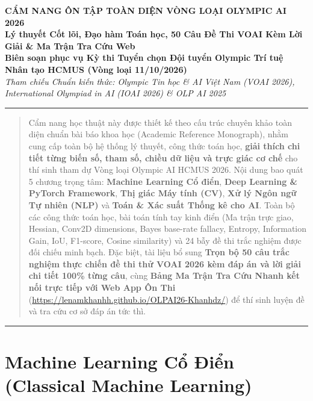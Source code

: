 \documentclass[10pt,a4paper]{article}
\begin{document}
\begin{center}
    {\Huge \textbf{\color{primaryblue} CẨM NANG ÔN TẬP TOÀN DIỆN VÒNG LOẠI OLYMPIC AI 2026}} \\[0.5em]
    {\LARGE \textbf{\color{secondaryblue} Lý thuyết Cốt lõi, Đạo hàm Toán học, 50 Câu Đề Thi VOAI Kèm Lời Giải \& Ma Trận Tra Cứu Web}} \\[0.8em]
    {\normalsize \textbf{Biên soạn phục vụ Kỳ thi Tuyển chọn Đội tuyển Olympic Trí tuệ Nhân tạo HCMUS (Vòng loại 11/10/2026)}} \\[0.4em]
    {\small \textit{Tham chiếu Chuẩn kiến thức: Olympic Tin học \& AI Việt Nam (VOAI 2026), International Olympiad in AI (IOAI 2026) \& OLP AI 2025}}
\end{center}

\vspace{0.5em}
\hrule height 1.2pt
\vspace{0.8em}

\begin{abstract}
\noindent Cẩm nang học thuật này được thiết kế theo cấu trúc chuyên khảo toàn diện chuẩn bài báo khoa học (Academic Reference Monograph), nhằm cung cấp toàn bộ hệ thống lý thuyết, công thức toán học, \textbf{giải thích chi tiết từng biến số, tham số, chiều dữ liệu và trực giác cơ chế} cho thí sinh tham dự Vòng loại Olympic AI HCMUS 2026. Nội dung bao quát 5 chương trọng tâm: \textbf{Machine Learning Cổ điển}, \textbf{Deep Learning \& PyTorch Framework}, \textbf{Thị giác Máy tính (CV)}, \textbf{Xử lý Ngôn ngữ Tự nhiên (NLP)} và \textbf{Toán \& Xác suất Thống kê cho AI}. Toàn bộ các công thức toán học, bài toán tính tay kinh điển (Ma trận trực giao, Hessian, Conv2D dimensions, Bayes base-rate fallacy, Entropy, Information Gain, IoU, F1-score, Cosine similarity) và 24 bẫy đề thi trắc nghiệm được đối chiếu minh bạch. Đặc biệt, tài liệu bổ sung \textbf{Trọn bộ 50 câu trắc nghiệm thực chiến đề thi thử VOAI 2026 kèm đáp án và lời giải chi tiết 100\% từng câu}, cùng \textbf{Bảng Ma Trận Tra Cứu Nhanh kết nối trực tiếp với Web App Ôn Thi} (\url{https://lenamkhanhh.github.io/OLPAI26-Khanhdz/}) để thí sinh luyện đề và tra cứu cơ sở đáp án tức thì.
\end{abstract}

\vspace{0.5em}
\tableofcontents
\vspace{1em}
\hrule
\vspace{1em}

\section{Machine Learning Cổ Điển (Classical Machine Learning)}
\end{document}

